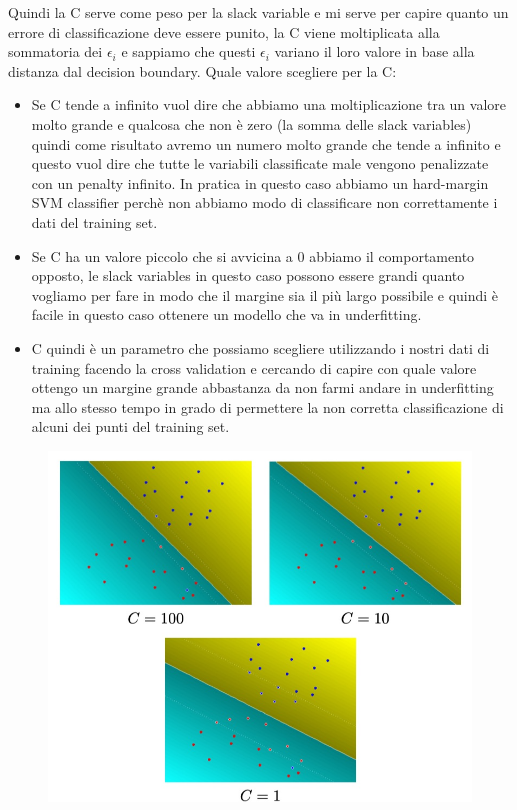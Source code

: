 \documentclass[14pt]{extreport}
\begin{document}
Quindi la C serve come peso per la slack variable e mi serve per capire quanto un errore di classificazione deve essere punito, la C viene
moltiplicata alla sommatoria dei $\epsilon_i$ e sappiamo che questi $\epsilon_i$ variano il loro valore in base alla distanza dal decision boundary.
Quale valore scegliere per la C:
\begin{itemize}
	\item Se C tende a infinito vuol dire che abbiamo una moltiplicazione tra un valore molto grande e qualcosa che non è zero (la somma delle slack
	      variables) quindi come risultato avremo un numero molto grande che tende a infinito e questo vuol dire che tutte le variabili classificate
	      male vengono penalizzate con un penalty infinito. In pratica in questo caso abbiamo un hard-margin SVM classifier perchè non abbiamo modo di
	      classificare non correttamente i dati del training set.
	\item Se C ha un valore piccolo che si avvicina a 0 abbiamo il comportamento opposto, le slack variables in questo caso possono essere grandi
	      quanto vogliamo per fare in modo che il margine sia il più largo possibile e quindi è facile in questo caso ottenere un modello che va in
	      underfitting.
	\item C quindi è un parametro che possiamo scegliere utilizzando i nostri dati di training facendo la cross validation e cercando di capire con
	      quale valore ottengo un margine grande abbastanza da non farmi andare in underfitting ma allo stesso tempo in grado di permettere la non
	      corretta classificazione di alcuni dei punti del training set.
\end{itemize}

\begin{figure}[H]
	\centering
	\includegraphics[width=0.7\linewidth]{326.jpeg}
\end{figure}
\end{document}
